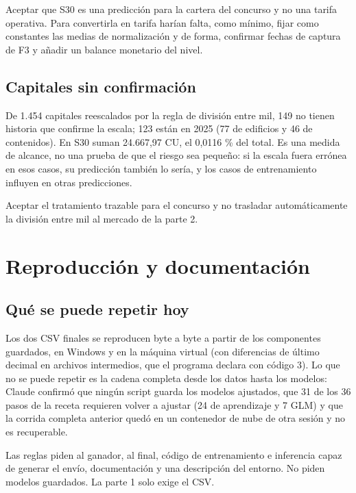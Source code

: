 \documentclass[11pt,a4paper]{article}
\begin{document}
\begin{pendiente}
Aceptar que S30 es una predicción para la cartera del concurso y no una tarifa operativa. Para convertirla en tarifa harían falta, como mínimo, fijar como constantes las medias de normalización y de forma, confirmar fechas de captura de F3 y añadir un balance monetario del nivel.
\end{pendiente}

\subsection{Capitales sin confirmación}
De 1.454 capitales reescalados por la regla de división entre mil, 149 no tienen historia que confirme la escala; 123 están en 2025 (77 de edificios y 46 de contenidos). En S30 suman 24.667,97 CU, el 0,0116 \% del total. Es una medida de alcance, no una prueba de que el riesgo sea pequeño: si la escala fuera errónea en esos casos, su predicción también lo sería, y los casos de entrenamiento influyen en otras predicciones.

\begin{pendiente}[P6 · capitales]
Aceptar el tratamiento trazable para el concurso y no trasladar automáticamente la división entre mil al mercado de la parte 2.
\end{pendiente}

\section{Reproducción y documentación}

\subsection{Qué se puede repetir hoy}
Los dos CSV finales se reproducen byte a byte a partir de los componentes guardados, en Windows y en la máquina virtual (con diferencias de último decimal en archivos intermedios, que el programa declara con código 3). Lo que no se puede repetir es la cadena completa desde los datos hasta los modelos: Claude confirmó que ningún script guarda los modelos ajustados, que 31 de los 36 pasos de la receta requieren volver a ajustar (24 de aprendizaje y 7 GLM) y que la corrida completa anterior quedó en un contenedor de nube de otra sesión y no es recuperable.

\begin{porque}
Las reglas piden al ganador, al final, código de entrenamiento e inferencia capaz de generar el envío, documentación y una descripción del entorno. No piden modelos guardados. La parte 1 solo exige el CSV.
\end{porque}
\end{document}
